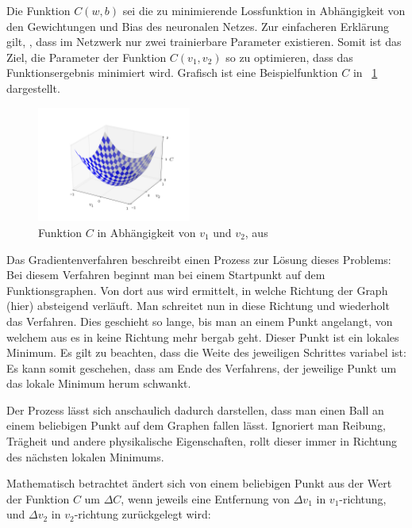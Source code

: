 Die Funktion $C(w, b)$ sei die zu minimierende Lossfunktion in Abhängigkeit von den Gewichtungen und Bias des neuronalen Netzes. Zur einfacheren Erklärung gilt, \oBdA, dass im Netzwerk nur zwei trainierbare Parameter existieren. Somit ist das Ziel, die Parameter der Funktion $C(v_1, v_2)$ so zu optimieren, dass das Funktionsergebnis minimiert wird. Grafisch ist eine Beispielfunktion $C$ in \figurename~\ref{fig:valley} dargestellt.

\begin{figure}[h!]
	\centering
	\includegraphics[width=0.45\textwidth,keepaspectratio]{images/Nie15_01.png}
	\caption{Funktion $C$ in Abhängigkeit von $v_1$ und $v_2$, aus \cite[Kap.~1]{nielsen_15}}
	\label{fig:valley}
\end{figure}

Das Gradientenverfahren beschreibt einen Prozess zur Lösung dieses Problems: Bei diesem Verfahren beginnt man bei einem Startpunkt auf dem Funktionsgraphen. Von dort aus wird ermittelt, in welche Richtung der Graph (hier) absteigend verläuft. Man schreitet nun in diese Richtung und wiederholt das Verfahren. Dies geschieht so lange, bis man an einem Punkt angelangt, von welchem aus es in keine Richtung mehr bergab geht. Dieser Punkt ist ein lokales Minimum. Es gilt zu beachten, dass die Weite des jeweiligen Schrittes variabel ist: Es kann somit geschehen, dass am Ende des Verfahrens, der jeweilige Punkt um das lokale Minimum herum schwankt.

Der Prozess lässt sich anschaulich dadurch darstellen, dass man einen Ball an einem beliebigen Punkt auf dem Graphen fallen lässt. Ignoriert man Reibung, Trägheit und andere physikalische Eigenschaften, rollt dieser immer in Richtung des nächsten lokalen Minimums.

Mathematisch betrachtet ändert sich von einem beliebigen Punkt aus der Wert der Funktion $C$ um $\Delta C$, wenn jeweils eine Entfernung von $\Delta v_1$ in $v_1$-richtung, und $\Delta v_2$ in $v_2$-richtung zurückgelegt wird: \cite[Kap.~1]{nielsen_15}

